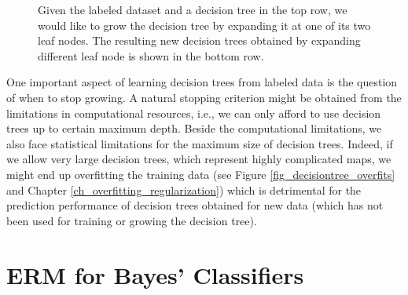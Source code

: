 \documentclass[12pt]{report}
\begin{document}
\begin{figure}[htbp]
\begin{minipage}{0.25\textwidth}
{}
\end{minipage}
\caption{Given the labeled dataset and a decision tree in the top row, we would like to grow the 
decision tree by expanding it at one of its two leaf nodes. The resulting new decision trees obtained 
by expanding different leaf node is shown in the bottom row.}
\label{fig_growingatree}
\end{figure}
 
One important aspect of learning decision trees from labeled data is the question of when to stop growing. 
A natural stopping criterion might be obtained from the limitations in computational resources, i.e., we can 
only afford to use decision trees up to certain maximum depth. Beside the computational limitations, we also 
face statistical limitations for the maximum size of decision trees. Indeed, if we allow very large decision trees, 
which represent highly complicated maps, we might end up overfitting the training data (see Figure \ref{fig_decisiontree_overfits} 
and Chapter \ref{ch_overfitting_regularization}) which is detrimental for the prediction performance of decision 
trees obtained for new data (which has not been used for training or growing the decision tree). 
 
 \section{ERM for Bayes' Classifiers} 
 \label{sec_ERM_Bayes} 
 
\end{document}
